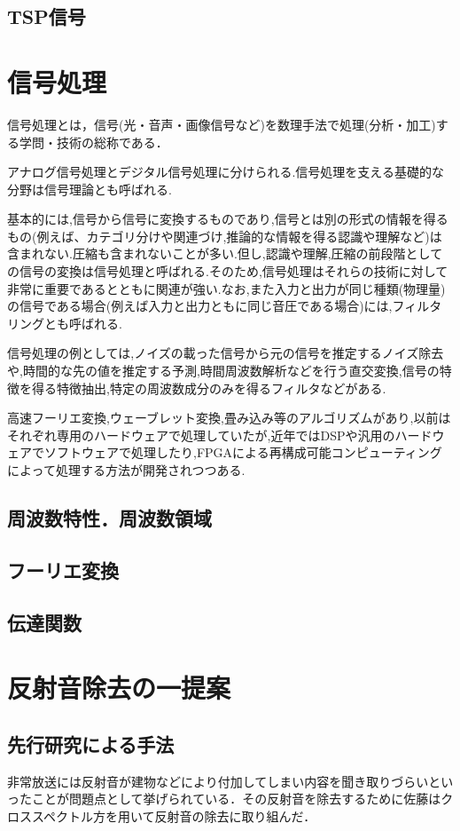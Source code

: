 \documentclass[a4j,11pt]{jsarticle}
\begin{document}
\subsection{TSP信号}
\newpage

\section{信号処理}
信号処理とは，信号(光・音声・画像信号など)を数理手法で処理(分析・加工)する学問・技術の総称である．

アナログ信号処理とデジタル信号処理に分けられる.信号処理を支える基礎的な分野は信号理論とも呼ばれる.

基本的には,信号から信号に変換するものであり,信号とは別の形式の情報を得るもの(例えば、カテゴリ分けや関連づけ,推論的な情報を得る認識や理解など)は含まれない.圧縮も含まれないことが多い.但し,認識や理解,圧縮の前段階としての信号の変換は信号処理と呼ばれる.そのため,信号処理はそれらの技術に対して非常に重要であるとともに関連が強い.なお,また入力と出力が同じ種類(物理量)の信号である場合(例えば入力と出力ともに同じ音圧である場合)には,フィルタリングとも呼ばれる.

信号処理の例としては,ノイズの載った信号から元の信号を推定するノイズ除去や,時間的な先の値を推定する予測,時間周波数解析などを行う直交変換,信号の特徴を得る特徴抽出,特定の周波数成分のみを得るフィルタなどがある.

高速フーリエ変換,ウェーブレット変換,畳み込み等のアルゴリズムがあり,以前はそれぞれ専用のハードウェアで処理していたが,近年ではDSPや汎用のハードウェアでソフトウェアで処理したり,FPGAによる再構成可能コンピューティングによって処理する方法が開発されつつある.


\subsection{周波数特性．周波数領域}
\subsection{フーリエ変換}
\subsection{伝達関数}

\newpage

\section{反射音除去の一提案}
\subsection{先行研究による手法}
非常放送には反射音が建物などにより付加してしまい内容を聞き取りづらいといったことが問題点として挙げられている．その反射音を除去するために佐藤はクロススペクトル方を用いて反射音の除去に取り組んだ．
\end{document}

